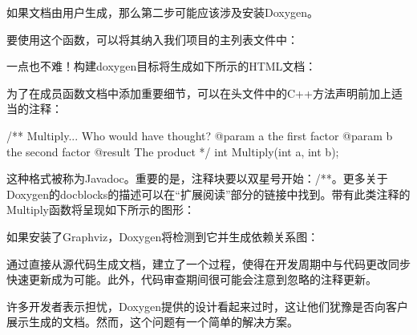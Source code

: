 如果文档由用户生成，那么第二步可能应该涉及安装Doxygen。

要使用这个函数，可以将其纳入我们项目的主列表文件中：



一点也不难！构建doxygen目标将生成如下所示的HTML文档：


为了在成员函数文档中添加重要细节，可以在头文件中的C++方法声明前加上适当的注释：


\begin{cpp}
/**
    Multiply... Who would have thought?
    @param a the first factor
    @param b the second factor
    @result The product
*/
int Multiply(int a, int b);
\end{cpp}

这种格式被称为Javadoc。重要的是，注释块要以双星号开始：/**。更多关于Doxygen的docblocks的描述可以在“扩展阅读”部分的链接中找到。带有此类注释的Multiply函数将呈现如下所示的图形：


如果安装了Graphviz，Doxygen将检测到它并生成依赖关系图：


通过直接从源代码生成文档，建立了一个过程，使得在开发周期中与代码更改同步快速更新成为可能。此外，代码审查期间很可能会注意到忽略的注释更新。

许多开发者表示担忧，Doxygen提供的设计看起来过时，这让他们犹豫是否向客户展示生成的文档。然而，这个问题有一个简单的解决方案。



















































